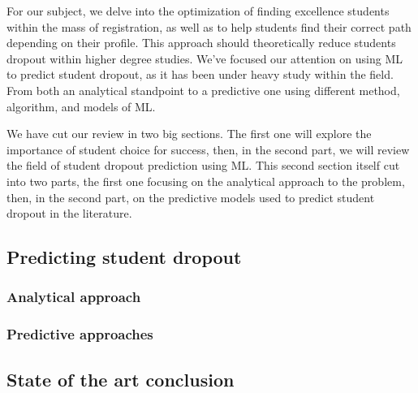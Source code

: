 \documentclass[../main.tex]{subfiles}
\begin{document}
For our subject, we delve into the optimization of finding excellence students within the mass of registration, as well as to help students find their correct path depending on their profile. This approach should theoretically reduce students dropout within higher degree studies.
We've focused our attention on using ML to predict student dropout, as it has been under heavy study within the field. From both an analytical standpoint to a predictive one using different method, algorithm, and models of ML.

We have cut our review in two big sections. The first one will explore the importance of student choice for success, then, in the second part, we will review the field of student dropout prediction using ML. This second section itself cut into two parts, the first one focusing on the analytical approach to the problem, then, in the second part, on the predictive models used to predict student dropout in the literature.

\subsection{Predicting student dropout}
\label{subsec:soa_predictingstudentdropout}


\subsubsection{Analytical approach}
\label{subsubsec:soa_analyticalapproach}



\subsubsection{Predictive approaches}
\label{subsubsec:soa_predictiveapproach}


\vspace{8pt}
\subsection{State of the art conclusion}
\label{subsec:soa_cc}

\end{document}
